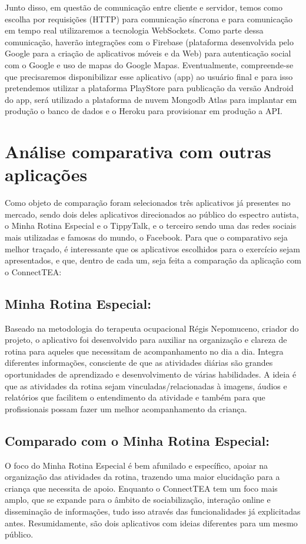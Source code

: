 \documentclass[
    12pt,               %
    openright,          %
    oneside,
    a4paper,            %
    paginasA3,  %
    BIBLATEX,           %
    REFINDENT,          %
    MODELO,             %
    TODO,               %
    english,            %
    brazil              %
    ]{ifsp-spo-inf-ctds} %
\begin{document}
\begin{apendicesenv}
Junto disso, em questão de comunicação entre cliente e servidor, temos como escolha por requisições (HTTP) para comunicação síncrona e para comunicação em tempo real utilizaremos a tecnologia WebSockets. Como parte dessa comunicação, haverão integrações com o Firebase (plataforma desenvolvida pelo Google para a criação de aplicativos móveis e da Web) para autenticação social com o Google e uso de mapas do Google Mapas.
Eventualmente, compreende-se que precisaremos disponibilizar esse aplicativo (app) ao usuário final e para isso pretendemos utilizar a plataforma PlayStore para publicação da versão Android do app, será utilizado a plataforma de nuvem Mongodb Atlas para implantar em produção o banco de dados e o Heroku para provisionar em produção a API.



\section{Análise comparativa com outras aplicações}
Como objeto de comparação foram selecionados três aplicativos já presentes no mercado, sendo dois deles aplicativos direcionados ao público do espectro autista, o Minha Rotina Especial e o TippyTalk, e o terceiro sendo uma das redes sociais mais utilizadas e famosas do mundo, o Facebook.
Para que o comparativo seja melhor traçado, é interessante que os aplicativos escolhidos para o exercício sejam apresentados, e que, dentro de cada um, seja feita a comparação da aplicação com o ConnectTEA:

\subsection{Minha Rotina Especial:}
Baseado na metodologia do terapeuta ocupacional Régis Nepomuceno, criador do projeto, o aplicativo foi desenvolvido para auxiliar na organização e clareza de rotina para aqueles que necessitam de acompanhamento no dia a dia.
Integra diferentes informações, consciente de que as atividades diárias são grandes oportunidades de aprendizado e desenvolvimento de várias habilidades.
A ideia é que as atividades da rotina sejam vinculadas/relacionadas à imagens, áudios e relatórios que facilitem o entendimento da atividade e também para que profissionais possam fazer um melhor acompanhamento da criança.

\subsection{Comparado com o Minha Rotina Especial:}
O foco do Minha Rotina Especial é bem afunilado e específico, apoiar na organização das atividades da rotina, trazendo uma maior elucidação para a criança que necessita de apoio. Enquanto o ConnectTEA tem um foco mais amplo, que se expande para o âmbito de sociabilização, interação online e disseminação de informações, tudo isso através das funcionalidades já explicitadas antes. Resumidamente, são dois aplicativos com ideias diferentes para um mesmo público.



\end{apendicesenv}
\end{document}
